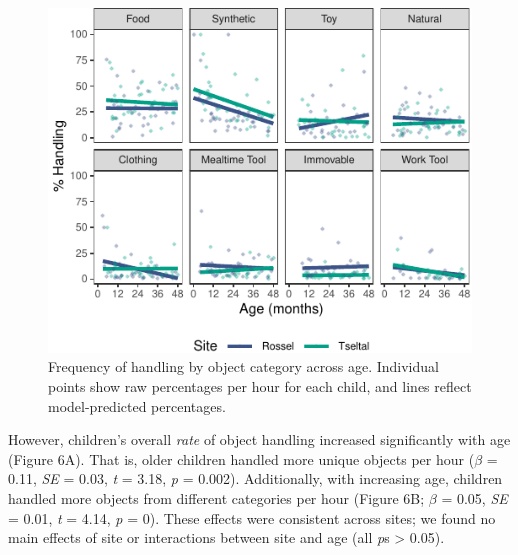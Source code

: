 \documentclass[10pt, letterpaper]{article}
\newenvironment{CodeChunk}{}{}
\begin{document}
\begin{CodeChunk}
\begin{figure}[!ht]

{\centering \includegraphics{figs/age-effects-bycategory-fig-1} 

}

\caption[Frequency of handling by object category across age]{Frequency of handling by object category across age. Individual points show raw percentages per hour for each child, and lines reflect model-predicted percentages.}\label{fig:age-effects-bycategory-fig}
\end{figure}
\end{CodeChunk}

However, children's overall \emph{rate} of object handling increased
significantly with age (Figure 6A). That is, older children handled more
unique objects per hour (\(\beta\) = 0.11, \emph{SE} = 0.03, \emph{t} =
3.18, \emph{p} = 0.002). Additionally, with increasing age, children
handled more objects from different categories per hour (Figure 6B;
\(\beta\) = 0.05, \emph{SE} = 0.01, \emph{t} = 4.14, \emph{p} = 0).
These effects were consistent across sites; we found no main effects of
site or interactions between site and age (all \emph{p}s \textgreater{}
0.05).
\end{document}
